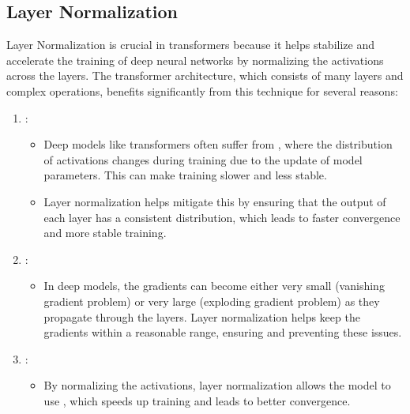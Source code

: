 \documentclass[letterpaper,11pt,english]{sphinxmanual}
\begin{document}
\subsection{Layer Normalization}
\label{\detokenize{pretraining:layer-normalization}}
\sphinxAtStartPar
Layer Normalization is crucial in transformers because it helps
stabilize and accelerate the training of deep neural networks by
normalizing the activations across the layers. The transformer
architecture, which consists of many layers and complex operations,
benefits significantly from this technique for several reasons:
\begin{enumerate}
%
\item {} 
\sphinxAtStartPar
{}:
\begin{itemize}
\item {} 
\sphinxAtStartPar
Deep models like transformers often suffer from , where the distribution of activations changes
during training due to the update of model parameters. This can
make training slower and less stable.

\item {} 
\sphinxAtStartPar
Layer normalization helps mitigate this by ensuring that the output
of each layer has a consistent distribution, which leads to faster
convergence and more stable training.

\end{itemize}

\item {} 
\sphinxAtStartPar
{}:
\begin{itemize}
\item {} 
\sphinxAtStartPar
In deep models, the gradients can become either very small
(vanishing gradient problem) or very large (exploding gradient
problem) as they propagate through the layers. Layer normalization
helps keep the gradients within a reasonable range, ensuring
 and preventing these issues.

\end{itemize}

\item {} 
\sphinxAtStartPar
{}:
\begin{itemize}
\item {} 
\sphinxAtStartPar
By normalizing the activations, layer normalization allows the
model to use , which speeds up training
and leads to better convergence.


\end{itemize}
\end{enumerate}
\end{document}
